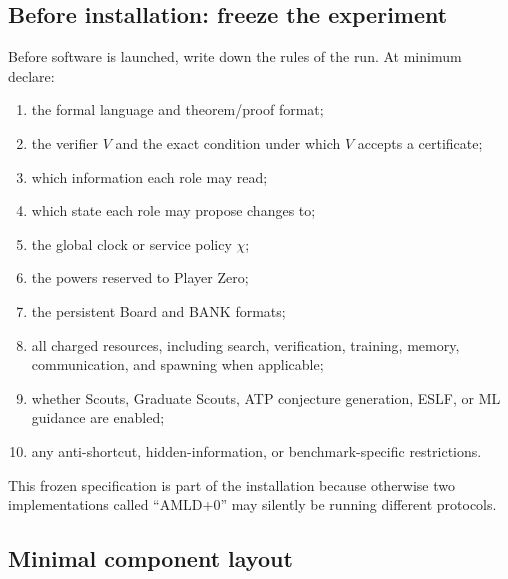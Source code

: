 \documentclass[11pt]{article}
\theoremstyle{definition}
\begin{document}
\subsection{Before installation: freeze the experiment}

Before software is launched, write down the rules of the run. At minimum declare:
\begin{enumerate}[label=(\arabic*),leftmargin=*]
\item the formal language and theorem/proof format;
\item the verifier $V$ and the exact condition under which $V$ accepts a certificate;
\item which information each role may read;
\item which state each role may propose changes to;
\item the global clock or service policy $\chi$;
\item the powers reserved to Player Zero;
\item the persistent Board and BANK formats;
\item all charged resources, including search, verification, training, memory, communication, and spawning when applicable;
\item whether Scouts, Graduate Scouts, ATP conjecture generation, ESLF, or ML guidance are enabled;
\item any anti-shortcut, hidden-information, or benchmark-specific restrictions.
\end{enumerate}
This frozen specification is part of the installation because otherwise two implementations called ``AMLD+0'' may silently be running different protocols.

\subsection{Minimal component layout}
\end{document}
